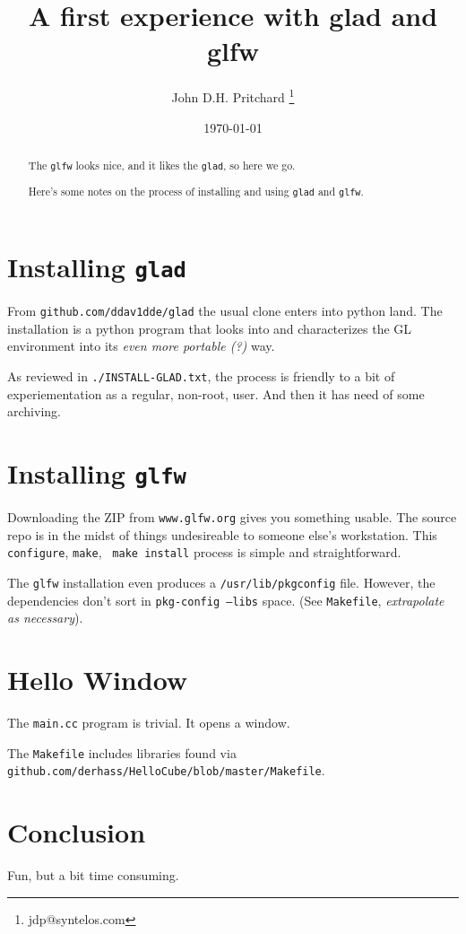 \documentclass[12pt,twocolumn]{article}
\begin{document}
\title{A first experience with glad and glfw}

\author{John D.H. Pritchard \thanks{jdp@syntelos.com}}

\date{\today}

\maketitle


\begin{abstract}

The {\tt glfw} looks nice, and it likes the {\tt glad}, so here we go.

Here's some notes on the process of installing and using {\tt glad}
and {\tt glfw}.

\end{abstract}


\section{Installing {\tt glad}}

From {\tt github.com/ddav1dde/glad} the usual clone enters into python
land.  The installation is a python program that looks into and
characterizes the GL environment into its {\it even more portable (?)
}  way.  

As reviewed in {\tt ./INSTALL-GLAD.txt}, the process is friendly to a
bit of experiementation as a regular, non-root, user.  And then it has
need of some archiving.

\section{Installing {\tt glfw}}

Downloading the ZIP from {\tt www.glfw.org} gives you something
usable.  The source repo is in the midst of things undesireable to
someone else's workstation.  This {\tt configure}, {\tt make}, {\tt
  make install} process is simple and straightforward.  

The {\tt glfw} installation even produces a {\tt /usr/lib/pkgconfig}
file.  However, the dependencies don't sort in {\tt pkg-config --libs}
space.  (See {\tt Makefile}, {\it extrapolate as necessary}).

\section{Hello Window}

The {\tt main.cc} program is trivial.  It opens a window.

The {\tt Makefile} includes libraries found via {\tt
  github.com/derhass/HelloCube/blob/master/Makefile}.


\section{Conclusion}

Fun, but a bit time consuming.


\end{document}
